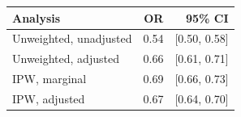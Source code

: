 \begin{tabular}{lrr}
\toprule
Analysis & OR & 95\% CI \\
\midrule
Unweighted, unadjusted & 0.54 & [0.50, 0.58] \\
Unweighted, adjusted & 0.66 & [0.61, 0.71] \\
IPW, marginal & 0.69 & [0.66, 0.73] \\
IPW, adjusted & 0.67 & [0.64, 0.70] \\
\bottomrule
\end{tabular}